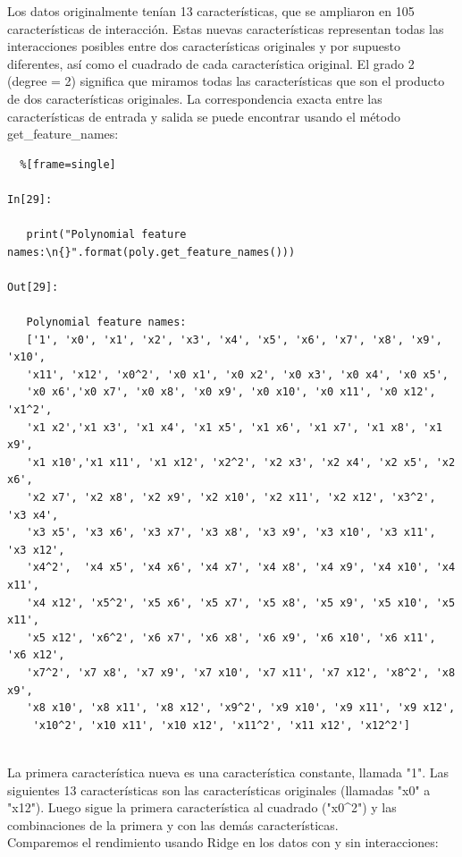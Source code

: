  
Los datos originalmente tenían 13 características, que se ampliaron en 105 características  de interacción. Estas nuevas características representan todas las interacciones posibles entre dos características originales y por supuesto diferentes, así como el cuadrado de cada característica original. El grado 2 (degree = 2)   significa que miramos todas las características que son el producto de  dos características originales. La correspondencia exacta entre las características de entrada y salida se puede encontrar usando el método {\ttfamily get\_feature\_names}:\\

\begin{lstlisting}  %[frame=single]

In[29]:

   print("Polynomial feature names:\n{}".format(poly.get_feature_names()))

Out[29]:

   Polynomial feature names:
   ['1', 'x0', 'x1', 'x2', 'x3', 'x4', 'x5', 'x6', 'x7', 'x8', 'x9', 'x10',
   'x11', 'x12', 'x0^2', 'x0 x1', 'x0 x2', 'x0 x3', 'x0 x4', 'x0 x5', 
   'x0 x6','x0 x7', 'x0 x8', 'x0 x9', 'x0 x10', 'x0 x11', 'x0 x12', 'x1^2',
   'x1 x2','x1 x3', 'x1 x4', 'x1 x5', 'x1 x6', 'x1 x7', 'x1 x8', 'x1 x9', 
   'x1 x10','x1 x11', 'x1 x12', 'x2^2', 'x2 x3', 'x2 x4', 'x2 x5', 'x2 x6',
   'x2 x7', 'x2 x8', 'x2 x9', 'x2 x10', 'x2 x11', 'x2 x12', 'x3^2', 'x3 x4',
   'x3 x5', 'x3 x6', 'x3 x7', 'x3 x8', 'x3 x9', 'x3 x10', 'x3 x11', 'x3 x12', 
   'x4^2',  'x4 x5', 'x4 x6', 'x4 x7', 'x4 x8', 'x4 x9', 'x4 x10', 'x4 x11', 
   'x4 x12', 'x5^2', 'x5 x6', 'x5 x7', 'x5 x8', 'x5 x9', 'x5 x10', 'x5 x11', 
   'x5 x12', 'x6^2', 'x6 x7', 'x6 x8', 'x6 x9', 'x6 x10', 'x6 x11', 'x6 x12', 
   'x7^2', 'x7 x8', 'x7 x9', 'x7 x10', 'x7 x11', 'x7 x12', 'x8^2', 'x8 x9', 
   'x8 x10', 'x8 x11', 'x8 x12', 'x9^2', 'x9 x10', 'x9 x11', 'x9 x12',
    'x10^2', 'x10 x11', 'x10 x12', 'x11^2', 'x11 x12', 'x12^2']


\end{lstlisting}

La primera característica nueva es una característica constante, llamada "1".  Las siguientes 13 características son las características originales (llamadas "x0"{}  a "x12"). Luego sigue la primera característica al cuadrado ("x0\^{}2") y las combinaciones de la primera y con las demás características. \\

Comparemos el rendimiento usando Ridge en los datos con y sin interacciones:\\



